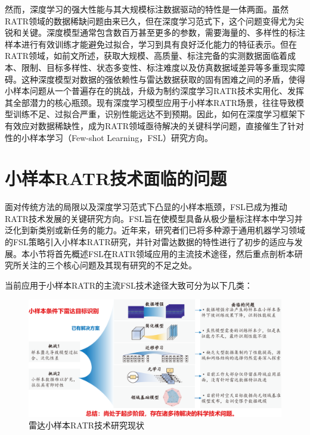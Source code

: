 然而，深度学习的强大性能与其大规模标注数据驱动的特性是一体两面。虽然RATR领域的数据稀缺问题由来已久，但在深度学习范式下，这个问题变得尤为尖锐和关键。深度模型通常包含数百万甚至更多的参数，需要海量的、多样性的标注样本进行有效训练才能避免过拟合，学习到具有良好泛化能力的特征表示。但在RATR领域，如前文所述，获取大规模、高质量、标注完备的实测数据面临着成本、限制、目标多样性、状态多变性、标注难度以及仿真数据域差异等多重现实障碍。这种深度模型对数据的强依赖性与雷达数据获取的固有困难之间的矛盾，使得小样本问题从一个普遍存在的挑战，升级为制约深度学习RATR技术实用化、发挥其全部潜力的核心瓶颈。现有深度学习模型应用于小样本RATR场景，往往导致模型训练不足、过拟合严重，识别性能远达不到预期。因此，如何在深度学习框架下有效应对数据稀缺性，成为RATR领域亟待解决的关键科学问题，直接催生了针对性的小样本学习（Few-shot Learning，FSL）研究方向。

\section{小样本RATR技术面临的问题} %
\label{sec:fsl_challenges} %
面对传统方法的局限以及深度学习范式下凸显的小样本瓶颈，FSL已成为推动RATR技术发展的关键研究方向。FSL旨在使模型具备从极少量标注样本中学习并泛化到新类别或新任务的能力。近年来，研究者们已将多种源于通用机器学习领域的FSL策略引入小样本RATR研究，并针对雷达数据的特性进行了初步的适应与发展。本小节将首先概述FSL在RATR领域应用的主流技术途径，然后重点剖析本研究所关注的三个核心问题及其现有研究的不足之处。

当前应用于小样本RATR的主流FSL技术途径大致可分为以下几类：

\begin{figure}[h]
    \centering
    \includegraphics[width=\linewidth]{figures/review.pdf} %
    \caption{雷达小样本RATR技术研究现状}
    \label{fig:meta_learning_paradigms}
\end{figure}


